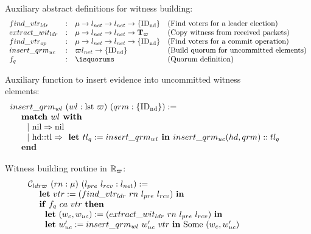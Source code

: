 \begin{figure}
\raggedright
{Auxiliary abstract definitions for witness building}: \\
$$
\begin{array}{llll}
find\_vtr_{ldr} &:& \termnum \rightarrow \networklog \rightarrow \networklog \rightarrow  \set{\nodeid} & \mbox{(Find voters for a leader election)}\\
extract\_wit_{ldr} &:& \termnum \rightarrow \networklog \rightarrow \networklog \rightarrow  \witnesstree & \mbox{(Copy witness from received packets)}\\
find\_vtr_{op} &:& \termnum \rightarrow \networklog \rightarrow \networklog \rightarrow  \set{\nodeid} & \mbox{(Find voters for a commit operation)}\\
insert\_qrm_{uc} &:& \witness \networklog \rightarrow  \set{\nodeid} & \mbox{(Build quorum for uncommitted elements)}\\
f_{q} &:&  \isquorums & \mbox{(Quorum definition)}\\
\end{array}
$$
\raggedright
{Auxiliary function to insert evidence into uncommitted witness elements}:\\
$$
\begin{array}{l}
insert\_qrm_{wl}\ (wl : \text{lst } \witness)\ (qrm:  \set{\nodeid}) :=\\
\ \ \ \  \text{\textbf{match }} wl \text{\textbf{ with}} \\ 
\ \ \ \  \ \ \vert \ \text{nil} \Rightarrow \text{nil} \\
\ \ \ \  \ \   \vert \ \text{hd::tl} \Rightarrow 
 \text{\textbf{ let }} tl_{q} :=  insert\_qrm_{wl} \text{\textbf{ in }} 
insert\_qrm_{uc}(hd, qrm)::tl_{q}  \\
\ \ \ \ \text{\textbf{end}} \\
\end{array}
$$
\raggedright
{Witness building routine in} ${\replay}_{\witness}$:  \\
$$
\begin{array}{ll}
\ldrwcons \ (rn: \termnum) \ (l_{pre}\ l_{rcv}: \networklog) := \\
\ \ \ \ \mbox{\textbf{let}}\ vtr := (find\_vtr_{ldr} \ rn \ l_{pre} \ l_{rcv})\  \mbox{\textbf{in}} \\ 
\ \ \ \ \mbox{\textbf{if}} \ f_{q} \ ca \ vtr \ \mbox{\textbf{then}}  \\
\ \ \ \ \ \ \mbox{\textbf{let}} \ (w_c, w_{uc}) := (extract\_wit_{ldr} \ rn \ l_{pre} \ l_{rcv})\  \mbox{\textbf{in}} \\
\ \ \ \ \ \ \mbox{\textbf{let}} \ w_{uc}' := insert\_qrm_{wl} \ w_{uc}' \ vtr \  \mbox{\textbf{in}}\ \text{Some}\ (w_c, w_{uc}')\\

\end{array}$$
\end{figure}
